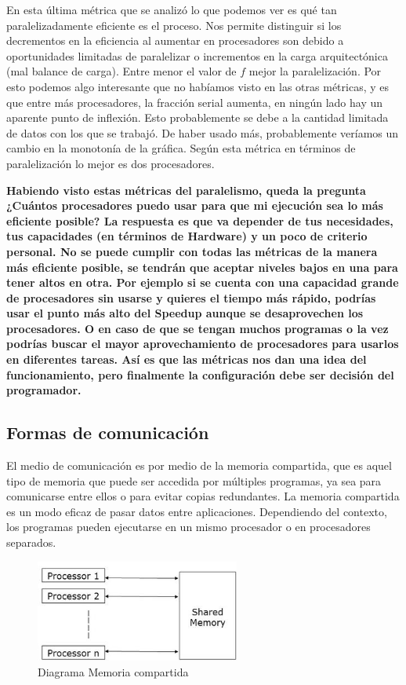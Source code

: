 \documentclass{report}
\begin{document}
\vspace{0.2cm}

En esta última métrica que se analizó lo que podemos ver es qué tan paralelizadamente eficiente es el proceso. Nos permite distinguir si los decrementos en la eficiencia al aumentar en procesadores son debido a oportunidades limitadas de paralelizar o incrementos en la carga arquitectónica (mal balance de carga). Entre menor el valor de $f$ mejor la paralelización. Por esto podemos algo interesante que no habíamos visto en las otras métricas, y es que entre más procesadores, la fracción serial aumenta, en ningún lado hay un aparente punto de inflexión. Esto probablemente se debe a la cantidad limitada de datos con los que se trabajó. De haber usado más, probablemente veríamos un cambio en la monotonía de la gráfica. Según esta métrica en términos de paralelización lo mejor es dos procesadores.

\vfill{}
\noindent \textbf{Habiendo visto estas métricas del paralelismo, queda la pregunta ¿Cuántos procesadores puedo usar para que mi ejecución sea lo más eficiente posible? La respuesta es que va depender de tus necesidades, tus capacidades (en términos de Hardware) y un poco de criterio personal. No se puede cumplir con todas las métricas de la manera más eficiente posible, se tendrán que aceptar niveles bajos en una para tener altos en otra. Por ejemplo si se cuenta con una capacidad grande de procesadores sin usarse y quieres el tiempo más rápido, podrías usar el punto más alto del Speedup aunque se desaprovechen los procesadores. O en caso de que se tengan muchos programas o la vez podrías buscar el mayor aprovechamiento de procesadores para usarlos en diferentes tareas. Así es que las métricas nos dan una idea del funcionamiento, pero finalmente la configuración debe ser decisión del programador.}
\clearpage


\subsection*{Formas de comunicación}

El medio de comunicación es por medio de la  memoria compartida, que es aquel tipo de memoria que puede ser accedida por múltiples programas, ya sea para comunicarse entre ellos o para evitar copias redundantes. La memoria compartida es un modo eficaz de pasar datos entre aplicaciones. Dependiendo del contexto, los programas pueden ejecutarse en un mismo procesador o en procesadores separados.

\begin{figure}[h!]
    \centering
    \includegraphics[width=0.6\textwidth]{Images/Memoria compartida.jpg}
    \caption{Diagrama Memoria compartida}
\end{figure}
\end{document}
